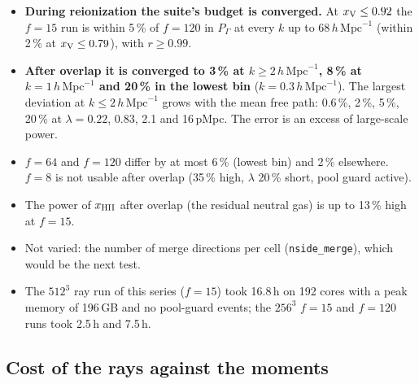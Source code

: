 \documentclass[11pt]{article}
\newcommand{\hmpc}{\,h\,\mathrm{Mpc}^{-1}}
\newcommand{\xv}{x_{\rm V}}
\begin{document}
\begin{itemize}
\item \textbf{During reionization the suite's budget is converged.} At $\xv\le0.92$ the $f=15$ run is within
5\,\% of $f=120$ in $P_\Gamma$ at every $k$ up to $68\hmpc$ (within 2\,\% at $\xv\le0.79$), with $r\ge0.99$.
\item \textbf{After overlap it is converged to 3\,\% at $k\ge2\hmpc$, 8\,\% at $k=1\hmpc$ and 20\,\% in the lowest
bin} ($k=0.3\hmpc$). The largest deviation at $k\le2\hmpc$ grows with the mean free path: 0.6\,\%, 2\,\%, 5\,\%, 20\,\%
at $\lambda=0.22$, 0.83, 2.1 and 16\,pMpc. The error is an excess of large-scale power.
\item $f=64$ and $f=120$ differ by at most 6\,\% (lowest bin) and 2\,\% elsewhere. $f=8$ is not usable after
overlap (35\,\% high, $\lambda$ 20\,\% short, pool guard active).
\item The power of $x_{\rm HII}$ after overlap (the residual neutral gas) is up to 13\,\% high at $f=15$.
\item Not varied: the number of merge directions per cell (\texttt{nside\_merge}), which would be the next test.
\item The $512^3$ ray run of this series ($f=15$) took 16.8\,h on 192 cores with a peak memory of 196\,GB and no pool-guard
events; the $256^3$ $f=15$ and $f=120$ runs took 2.5\,h and 7.5\,h.
\end{itemize}

\subsection{Cost of the rays against the moments}\label{sec:cost}
\end{document}
